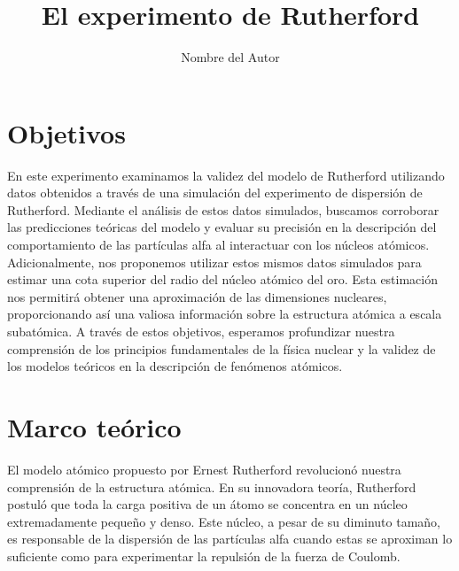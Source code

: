 \documentclass[twocolumn,a4paper,11pt]{scrartcl}
\title{El experimento de Rutherford}
\author{Nombre del Autor}
\date{}
\begin{document}

\section{Objetivos}
En este experimento examinamos la validez del modelo de Rutherford utilizando datos obtenidos a través de una simulación del experimento de dispersión de Rutherford. Mediante el análisis de estos datos simulados, buscamos corroborar las predicciones teóricas del modelo y evaluar su precisión en la descripción del comportamiento de las partículas alfa al interactuar con los núcleos atómicos. Adicionalmente, nos proponemos utilizar estos mismos datos simulados para estimar una cota superior del radio del núcleo atómico del oro. Esta estimación nos permitirá obtener una aproximación de las dimensiones nucleares, proporcionando así una valiosa información sobre la estructura atómica a escala subatómica. A través de estos objetivos, esperamos profundizar nuestra comprensión de los principios fundamentales de la física nuclear y la validez de los modelos teóricos en la descripción de fenómenos atómicos.

\section{Marco teórico}
El modelo atómico propuesto por Ernest Rutherford revolucionó nuestra comprensión de la estructura atómica. En su innovadora teoría, Rutherford postuló que toda la carga positiva de un átomo se concentra en un núcleo extremadamente pequeño y denso. Este núcleo, a pesar de su diminuto tamaño, es responsable de la dispersión de las partículas alfa cuando estas se aproximan lo suficiente como para experimentar la repulsión de la fuerza de Coulomb.
\end{document}
